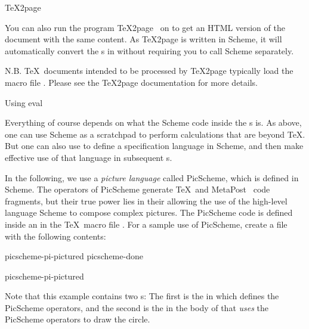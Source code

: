 \beginsection \TeX2page

You can also run the program \TeX2page~\cite{tex2page} on  to get an HTML
version of the document with the same content.  As \TeX2page is written in
Scheme, it will automatically convert the \p{\eval}s in 
without requiring you to call Scheme separately.


\n N.B.  \TeX\ documents intended to be processed by \TeX2page typically load the
macro file .  Please see the \TeX2page documentation for
more details.

 Using eval


Everything of course depends on what the Scheme code
inside the \p{\eval}s is.  As above, one can use Scheme
as a scratchpad to perform calculations that are beyond
\TeX.  But one can also use \p{\eval} to define a
specification language in Scheme, and then make
effective use of that language in subsequent
\p{\eval}s.

In the following, we use a {\em picture language}
called PicScheme, which is defined in Scheme.  The
operators of PicScheme generate \TeX\ and
MetaPost~\cite{metapost,metafont} code fragments, but
their true power lies in their allowing the use of the
high-level language Scheme to compose complex pictures.
The PicScheme code is defined inside an \p{\eval} in
the \TeX\ macro file .  For a sample use
of PicScheme, create a file  with
the following contents:

\verbwritefile picscheme-pi-pictured
\verbwritefile picscheme-done

\p{
}
\scminput picscheme-pi-pictured
\p{
\bye
}

\n Note that this example contains two \p{\eval}s:
The first is the \p{\eval} in 
which defines the PicScheme operators, and the second
is the \p{\eval} in the body of 
that {\em uses} the PicScheme operators to draw the circle.

